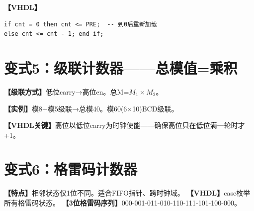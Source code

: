 \begin{detailbox}[完整教学]
\textbf{【VHDL】}
\begin{lstlisting}
if cnt = 0 then cnt <= PRE;  -- 到0后重新加载
else cnt <= cnt - 1; end if;
\end{lstlisting}
\end{detailbox}


\section{变式5：级联计数器——总模值=乘积}

\begin{detailbox}[完整教学]
\textbf{【级联方式】}低位carry→高位en。总M=$M_1 \times M_2$。

\textbf{【实例】}模8+模5级联→总模40。模60(6×10)BCD级联。

\textbf{【VHDL关键】}高位以低位carry为时钟使能——确保高位只在低位满一轮时才+1。
\end{detailbox}


\section{变式6：格雷码计数器}

\begin{detailbox}[完整教学]
\textbf{【特点】}相邻状态仅1位不同。适合FIFO指针、跨时钟域。
\textbf{【VHDL】}case枚举所有格雷码状态。
\textbf{【3位格雷码序列】}000-001-011-010-110-111-101-100-000。
\end{detailbox}
